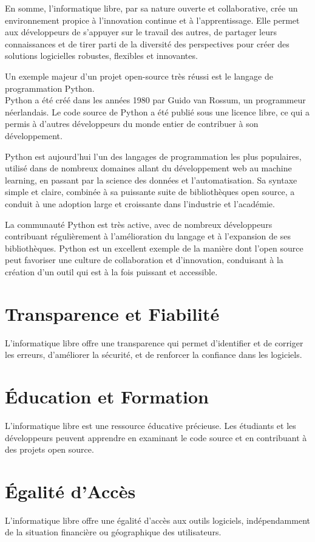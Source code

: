 En somme, l'informatique libre, par sa nature ouverte et collaborative, crée un environnement propice à l'innovation continue et à l'apprentissage. Elle permet aux développeurs de s'appuyer sur le travail des autres, de partager leurs connaissances et de tirer parti de la diversité des perspectives pour créer des solutions logicielles robustes, flexibles et innovantes.

Un exemple majeur d'un projet open-source très réussi est le langage de programmation Python.\\
Python a été créé dans les années 1980 par Guido van Rossum, un programmeur néerlandais. Le code source de Python a été publié sous une licence libre, ce qui a permis à d'autres développeurs du monde entier de contribuer à son développement.

Python est aujourd'hui l'un des langages de programmation les plus populaires, utilisé dans de nombreux domaines allant du développement web au machine learning, en passant par la science des données et l'automatisation. Sa syntaxe simple et claire, combinée à sa puissante suite de bibliothèques open source, a conduit à une adoption large et croissante dans l'industrie et l'académie.

La communauté Python est très active, avec de nombreux développeurs contribuant régulièrement à l'amélioration du langage et à l'expansion de ses bibliothèques. Python est un excellent exemple de la manière dont l'open source peut favoriser une culture de collaboration et d'innovation, conduisant à la création d'un outil qui est à la fois puissant et accessible.

\section{Transparence et Fiabilité}
L'informatique libre offre une transparence qui permet d'identifier et de corriger les erreurs, d'améliorer la sécurité, et de renforcer la confiance dans les logiciels.

\section{Éducation et Formation}
L'informatique libre est une ressource éducative précieuse. Les étudiants et les développeurs peuvent apprendre en examinant le code source et en contribuant à des projets open source.

\section{Égalité d'Accès}
L'informatique libre offre une égalité d'accès aux outils logiciels, indépendamment de la situation financière ou géographique des utilisateurs.

